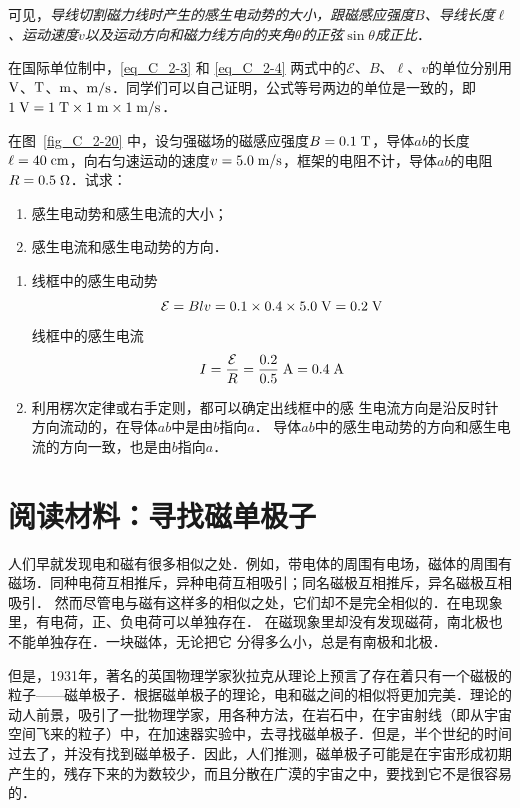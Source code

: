 可见，\textit{导线切割磁力线时产生的感生电动势的大小，跟磁感应强度$B$、导线长度$\ell$、运动速度$v$以及运动方向和磁力线方向的夹角$\theta$的正弦$\sin\theta$成正比}．

在国际单位制中，\eqref{eq_C_2-3} 和 \eqref{eq_C_2-4} 两式中的$\mathcal{E}$、$B$、$\ell$、$v$的单位分别用$\text{V}$、$\text{T}$、$\text{m}$、$\text{m}/\text{s}$．同学们可以自己证明，公式等号两边的单位是一致的，即$1 \;\text{V}=1\;\text{T} \times1\;\text{m}\times1\;\text{m}/\text{s}$．

\begin{example}
    在图~\ref{fig_C_2-20} 中，设匀强磁场的磁感应强度$B=0.1\;\text{T}$，导体$ab$的长度$\ell=40\;\text{cm}$，向右匀速运动的速度$v=5.0\;\text{m}/\text{s}$，框架的电阻不计，导体$ab$的电阻$R=0.5\;\Omega$．试求：
    \begin{enumerate}
        \item 感生电动势和感生电流的大小；
        \item 感生电流和感生电动势的方向．
    \end{enumerate}
\end{example}

\begin{solution}
\begin{enumerate}
    \item 线框中的感生电动势
\[\mathcal{E}=Blv=0.1\times0.4\times5.0 \;\text{V} =0.2 \;\text{V} \]    
线框中的感生电流
\[I=\frac{\mathcal{E}}{R}=\frac{0.2}{0.5} \;\text{A} =0.4\;\text{A} \]

\item 利用楞次定律或右手定则，都可以确定出线框中的感
生电流方向是沿反时针方向流动的，在导体$ab$中是由$b$指向$a$． 导体$ab$中的感生电动势的方向和感生电流的方向一致，也是由$b$指向$a$．
\end{enumerate}
\end{solution}
   
\section*{阅读材料：寻找磁单极子}
人们早就发现电和磁有很多相似之处．例如，带电体的周围有电场，磁体的周围有磁场．同种电荷互相推斥，异种电荷互相吸引；同名磁极互相推斥，异名磁极互相吸引．
然而尽管电与磁有这样多的相似之处，它们却不是完全相似的．在电现象里，有电荷，正、负电荷可以单独存在．
在磁现象里却没有发现磁荷，南北极也不能单独存在．一块磁体，无论把它
分得多么小，总是有南极和北极．

但是，1931年，著名的英国物理学家狄拉克从理论上预言了存在着只有一个磁极的粒子——磁单极子．根据磁单极子的理论，电和磁之间的相似将更加完美．理论的动人前景，吸引了一批物理学家，用各种方法，在岩石中，在宇宙射线（即从宇宙空间飞来的粒子）中，在加速器实验中，去寻找磁单极子．但是，半个世纪的时间过去了，并没有找到磁单极子．因此，人们推测，磁单极子可能是在宇宙形成初期产生的，残存下来的为数较少，而且分散在广漠的宇宙之中，要找到它不是很容易的．


